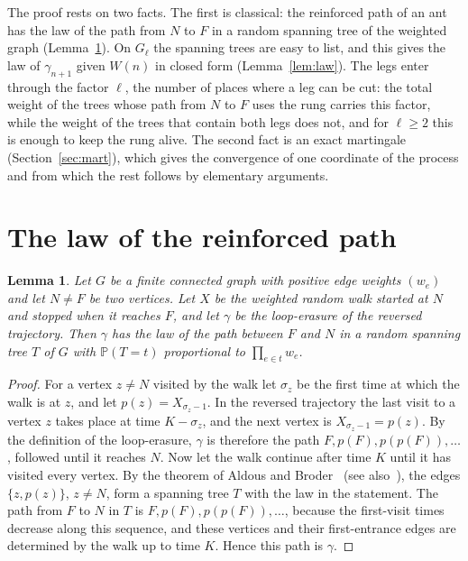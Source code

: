 \documentclass[11pt]{amsart}
\newtheorem{lemma}[theorem]{Lemma}
\theoremstyle{remark}
\newcommand{\PP}{\mathbb{P}}
\begin{document}
The proof rests on two facts. The first is classical: the reinforced path of an ant has the law of the path from $N$
to $F$ in a random spanning tree of the weighted graph (Lemma~\ref{lem:ust}). On $G_\ell$ the spanning trees are easy
to list, and this gives the law of $\gamma_{n+1}$ given $W(n)$ in closed form (Lemma~\ref{lem:law}). The legs enter
through the factor $\ell$, the number of places where a leg can be cut: the total weight of the trees whose path from
$N$ to $F$ uses the rung carries this factor, while the weight of the trees that contain both legs does not, and for
$\ell\ge2$ this is enough to keep the rung alive. The second fact is an exact martingale (Section~\ref{sec:mart}), which gives the
convergence of one coordinate of the process and from which the rest follows by elementary arguments.

\section{The law of the reinforced path}\label{sec:law}

\begin{lemma}\label{lem:ust}
Let $G$ be a finite connected graph with positive edge weights $(w_e)$ and let $N\ne F$ be two vertices. Let $X$ be
the weighted random walk started at $N$ and stopped when it reaches $F$, and let $\gamma$ be the loop-erasure of the
reversed trajectory. Then $\gamma$ has the law of the path between $F$ and $N$ in a random spanning tree $T$ of $G$
with $\PP(T=t)$ proportional to $\prod_{e\in t}w_e$.
\end{lemma}
\begin{proof}
For a vertex $z\ne N$ visited by the walk let $\sigma_z$ be the first time at which the walk is at $z$, and let
$p(z)=X_{\sigma_z-1}$. In the reversed trajectory the last visit to a vertex $z$ takes place at time $K-\sigma_z$, and
the next vertex is $X_{\sigma_z-1}=p(z)$. By the definition of the loop-erasure, $\gamma$ is therefore the path
$F,p(F),p(p(F)),\dots$, followed until it reaches $N$. Now let the walk continue after time $K$ until it has visited
every vertex. By the theorem of Aldous and Broder~\cite{Aldous,Broder} (see also~\cite[Chapter~4]{LP}), the edges
$\{z,p(z)\}$, $z\ne N$, form a spanning tree $T$ with the law in the statement. The path from $F$ to $N$ in $T$ is
$F,p(F),p(p(F)),\dots$, because the first-visit times decrease along this sequence, and these vertices and their
first-entrance edges are determined by the walk up to time $K$. Hence this path is $\gamma$.
\end{proof}
\end{document}

